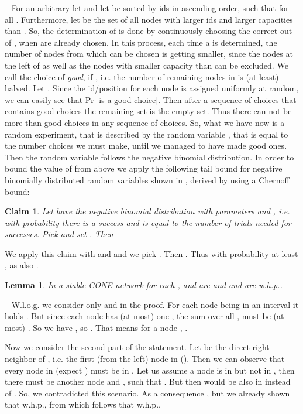 \documentclass[11pt]{article}
\newtheorem{lemma}[theorem]{Lemma}
\newtheorem{claim}[theorem]{Claim}
\newcommand{\sq}{\hbox{\rlap{}}}
\newcommand{\qed}{\hspace*{\fill}\sq}
\newenvironment{proof}{\noindent {\bf Proof.}\ }{\qed\par\vskip 4mm\par}
\begin{document}
\begin{proof}
For an arbitrary  let  and let  be sorted by ids in ascending order, such that  for all . Furthermore, let  be the set of all nodes with larger ids and larger capacities than .
So, the determination of  is done by continuously choosing the correct  out of , when  are already chosen.
In this process, each time a  is determined, the number of nodes from which  can be chosen is getting smaller, since the nodes at the left of  as well as the nodes with smaller capacity than  can be excluded.
We call the choice of  \emph{good}, if , i.e. the number of remaining nodes in  is (at least) halved. Let . Since the id/position for each node is assigned uniformly at random, we can easily see that Pr[ is a good choice].
Then after a sequence of  choices that contains  good choices the remaining set  is the empty set. Thus there can not be more than  good choices in any sequence of choices.
So, what we have now is a random experiment, that is described by the random variable , that is equal to the number choices we must make, until we managed to have made  good ones. Then the random variable  follows the negative binomial distribution.
In order to bound the value of  from above we apply the following tail bound for negative binomially distributed random variables shown in \cite{NegBi}, derived by using a Chernoff bound:

\begin{claim}
Let  have the negative binomial distribution with parameters  and , i.e. with probability  there is a success and  is equal to the number of trials needed for  successes. Pick  and set . Then 
\end{claim}

We apply this claim with  and  and we pick . Then . Thus with probability at least ,  as  also .
\end{proof}

\begin{lemma}
In a stable CONE network for each ,  and  are  and  and  are  w.h.p..
\end{lemma}

\begin{proof}
W.l.o.g. we consider only  and  in the proof.
For each node  being in an interval  it holds . But since each node has (at most) one , the sum over all ,  must be (at most) . So we have , so    .
That means for a node , .

Now we consider the second part of the statement.
Let  be the direct right neighbor of , i.e. the first (from the left) node in  (). Then we can observe that every node in  (expect ) must be in . Let us assume a node  is in   but not in , then there must be another node  and , such that . But then  would be also in   instead of .
So, we contradicted this scenario. As a consequence  , but we already shown that  w.h.p., from which follows that  w.h.p..
\end{proof}
\end{document}
